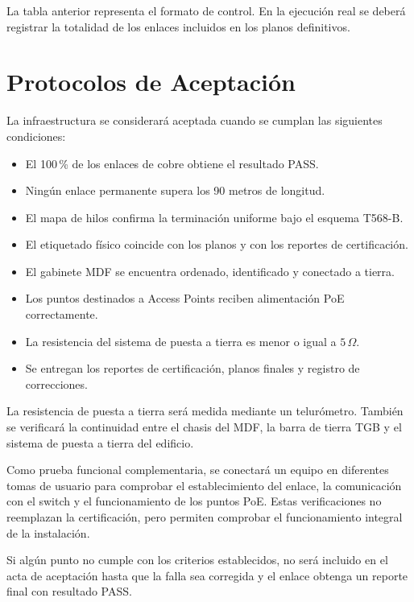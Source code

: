 La tabla anterior representa el formato de control. En la ejecución real se deberá registrar la totalidad de los enlaces incluidos en los planos definitivos.

\section{Protocolos de Aceptación}

La infraestructura se considerará aceptada cuando se cumplan las siguientes condiciones:

\begin{itemize}
    \item El 100\,\% de los enlaces de cobre obtiene el resultado PASS.
    \item Ningún enlace permanente supera los 90 metros de longitud.
    \item El mapa de hilos confirma la terminación uniforme bajo el esquema T568-B.
    \item El etiquetado físico coincide con los planos y con los reportes de certificación.
    \item El gabinete MDF se encuentra ordenado, identificado y conectado a tierra.
    \item Los puntos destinados a Access Points reciben alimentación PoE correctamente.
    \item La resistencia del sistema de puesta a tierra es menor o igual a \(5\,\Omega\).
    \item Se entregan los reportes de certificación, planos finales y registro de correcciones.
\end{itemize}

La resistencia de puesta a tierra será medida mediante un telurómetro. También se verificará la continuidad entre el chasis del MDF, la barra de tierra TGB y el sistema de puesta a tierra del edificio.

Como prueba funcional complementaria, se conectará un equipo en diferentes tomas de usuario para comprobar el establecimiento del enlace, la comunicación con el switch y el funcionamiento de los puntos PoE. Estas verificaciones no reemplazan la certificación, pero permiten comprobar el funcionamiento integral de la instalación.

Si algún punto no cumple con los criterios establecidos, no será incluido en el acta de aceptación hasta que la falla sea corregida y el enlace obtenga un reporte final con resultado PASS.
